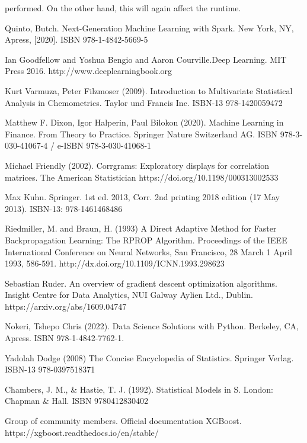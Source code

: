 \documentclass[11pt,a4paper]{scrreprt}
\begin{document}
performed. On the other hand, this will again affect the runtime.
	
	\begin{thebibliography}{9}
	 Quinto, Butch. Next-Generation Machine Learning with Spark. New York, NY, Apress, [2020].
	ISBN 978-1-4842-5669-5
	
	 Ian Goodfellow and Yoshua Bengio and Aaron Courville.Deep Learning. MIT Press 2016. http://www.deeplearningbook.org
	
	 Kurt Varmuza, Peter Filzmoser (2009). Introduction to Multivariate Statistical Analysis in Chemometrics. Taylor und Francis Inc. ISBN-13 978-1420059472
	
	 Matthew F. Dixon, Igor Halperin, Paul Bilokon (2020). Machine Learning in Finance. From Theory to Practice. Springer Nature Switzerland AG. ISBN 978-3-030-41067-4 / e-ISBN 978-3-030-41068-1
	
	
	 Michael Friendly (2002). Corrgrams: Exploratory displays for correlation matrices. The American Statistician
	https://doi.org/10.1198/000313002533
	
	 Max Kuhn. Springer. 1st ed. 2013, Corr. 2nd printing 2018 edition (17 May 2013).
	ISBN-13: 978-1461468486
	
	 Riedmiller, M. and Braun, H. (1993) A Direct Adaptive Method for Faster Backpropagation Learning: The RPROP Algorithm. Proceedings of the IEEE International Conference on Neural Networks, San Francisco, 28 March 1 April 1993, 586-591. {http://dx.doi.org/10.1109/ICNN.1993.298623} 
	
		Sebastian Ruder. An overview of gradient descent optimization algorithms. Insight Centre for Data Analytics, NUI Galway
	Aylien Ltd., Dublin. https://arxiv.org/abs/1609.04747
	
	  Nokeri, Tshepo Chris (2022). Data Science Solutions with Python. Berkeley, CA, Apress. ISBN 978-1-4842-7762-1.

	 Yadolah Dodge (2008) The Concise Encyclopedia of Statistics. Springer Verlag. 
	ISBN-13 978-0397518371
	
	 Chambers, J. M., \& Hastie, T. J. (1992). Statistical Models in S. London: Chapman \& Hall. ISBN 9780412830402
	
		Group of community members. Official documentation XGBoost. https://xgboost.readthedocs.io/en/stable/
	
	
	
	


\end{thebibliography}
\end{document}
